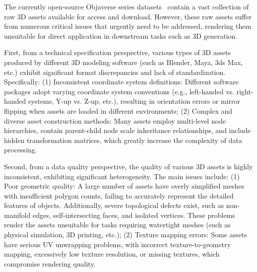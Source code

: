 \documentclass{article} %
\begin{document}


The currently open-source Objaverse series datasets~\cite{objaverse,objaverseXL} contain a vast collection of raw 3D assets available for access and download. However, these raw assets suffer from numerous critical issues that urgently need to be addressed, rendering them unsuitable for direct application in downstream tasks such as 3D generation.

First, from a technical specification perspective, various types of 3D assets produced by different 3D modeling software (such as Blender, Maya, 3ds Max, etc.) exhibit significant format discrepancies and lack of standardization. Specifically: (1) Inconsistent coordinate system definitions: Different software packages adopt varying coordinate system conventions (e.g., left-handed vs. right-handed systems, Y-up vs. Z-up, etc.), resulting in orientation errors or mirror flipping when assets are loaded in different environments; (2) Complex and diverse asset construction methods: Many assets employ multi-level node hierarchies, contain parent-child node scale inheritance relationships, and include hidden transformation matrices, which greatly increase the complexity of data processing.

Second, from a data quality perspective, the quality of various 3D assets is highly inconsistent, exhibiting significant heterogeneity. The main issues include: (1) Poor geometric quality: A large number of assets have overly simplified meshes with insufficient polygon counts, failing to accurately represent the detailed features of objects. Additionally, severe topological defects exist, such as non-manifold edges, self-intersecting faces, and isolated vertices. These problems render the assets unsuitable for tasks requiring watertight meshes (such as physical simulation, 3D printing, etc.); (2) Texture mapping errors: Some assets have serious UV unwrapping problems, with incorrect texture-to-geometry mapping, excessively low texture resolution, or missing textures, which compromise rendering quality.
\end{document}
